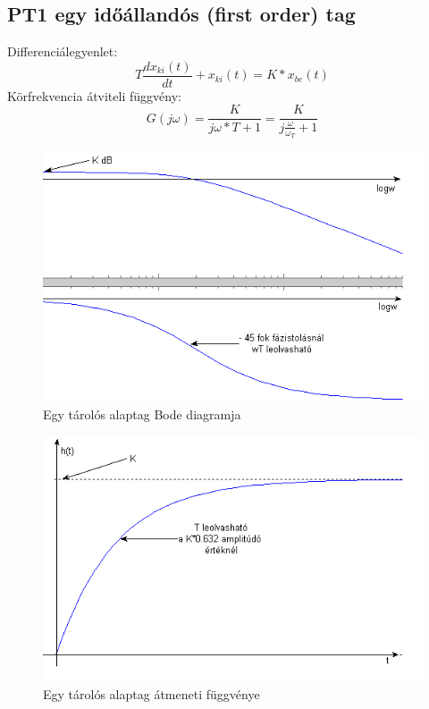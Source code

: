 \documentclass[11pt,a4paper]{article}
\begin{document}
\subsection{PT1 egy időállandós (first order) tag}
Differenciálegyenlet:$$T\frac{dx_{ki}\left(t\right)}{dt} + x_{ki}\left(t\right) = K * x_{be}\left(t\right)$$
Körfrekvencia átviteli függvény:$$G\left(j\omega\right) = \frac{K}{j\omega * T + 1}=\frac{K}{j\frac{\omega}{\omega_T} + 1}$$
\begin{figure}[hbtp]
    	 \centering
		\includegraphics[scale=1.0]{32_pt1_tag_bode.png}
		\caption{Egy tárolós alaptag Bode diagramja}
\end{figure}
\begin{figure}[hbtp]
    	 \centering
		\includegraphics[scale=1.0]{33_pt1_tag_atmenet.png}
		\caption{Egy tárolós alaptag átmeneti függvénye}
\end{figure}
\newpage
\end{document}

